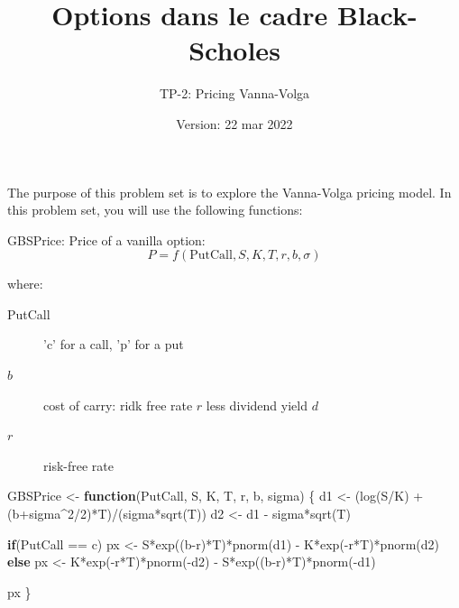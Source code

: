 \documentclass[
]{article}
\title{Options dans le cadre Black-Scholes}
\subtitle{TP-2: Pricing Vanna-Volga}
\author{}
\date{\vspace{-2.5em}Version: 22 mar 2022}
\newenvironment{Shaded}{\begin{snugshade}}{\end{snugshade}}
\newcommand{\ControlFlowTok}[1]{\textcolor[rgb]{0.13,0.29,0.53}{\textbf{#1}}}
\newcommand{\DecValTok}[1]{\textcolor[rgb]{0.00,0.00,0.81}{#1}}
\newcommand{\FunctionTok}[1]{\textcolor[rgb]{0.00,0.00,0.00}{#1}}
\newcommand{\NormalTok}[1]{#1}
\newcommand{\OtherTok}[1]{\textcolor[rgb]{0.56,0.35,0.01}{#1}}
\newcommand{\SpecialCharTok}[1]{\textcolor[rgb]{0.00,0.00,0.00}{#1}}
\newcommand{\StringTok}[1]{\textcolor[rgb]{0.31,0.60,0.02}{#1}}
\begin{document}
\maketitle

The purpose of this problem set is to explore the Vanna-Volga pricing
model. In this problem set, you will use the following functions:

GBSPrice: Price of a vanilla option: \[
P = f(\text{PutCall}, S, K, T, r, b, \sigma)
\]

where:

\begin{description}
\item[PutCall] 'c' for a call, 'p' for a put
\item[$b$] cost of carry: ridk free rate $r$ less dividend yield $d$
\item[$r$] risk-free rate
\end{description}

\begin{Shaded}
\begin{Highlighting}[]
\NormalTok{GBSPrice }\OtherTok{\textless{}{-}} \ControlFlowTok{function}\NormalTok{(PutCall, S, K, T, r, b, sigma) \{}
\NormalTok{  d1 }\OtherTok{\textless{}{-}}\NormalTok{ (}\FunctionTok{log}\NormalTok{(S}\SpecialCharTok{/}\NormalTok{K) }\SpecialCharTok{+}\NormalTok{ (b}\SpecialCharTok{+}\NormalTok{sigma}\SpecialCharTok{\^{}}\DecValTok{2}\SpecialCharTok{/}\DecValTok{2}\NormalTok{)}\SpecialCharTok{*}\NormalTok{T)}\SpecialCharTok{/}\NormalTok{(sigma}\SpecialCharTok{*}\FunctionTok{sqrt}\NormalTok{(T))}
\NormalTok{  d2 }\OtherTok{\textless{}{-}}\NormalTok{ d1 }\SpecialCharTok{{-}}\NormalTok{ sigma}\SpecialCharTok{*}\FunctionTok{sqrt}\NormalTok{(T)}

  \ControlFlowTok{if}\NormalTok{(PutCall }\SpecialCharTok{==} \StringTok{\textquotesingle{}c\textquotesingle{}}\NormalTok{)  }
\NormalTok{    px }\OtherTok{\textless{}{-}}\NormalTok{ S}\SpecialCharTok{*}\FunctionTok{exp}\NormalTok{((b}\SpecialCharTok{{-}}\NormalTok{r)}\SpecialCharTok{*}\NormalTok{T)}\SpecialCharTok{*}\FunctionTok{pnorm}\NormalTok{(d1) }\SpecialCharTok{{-}}\NormalTok{ K}\SpecialCharTok{*}\FunctionTok{exp}\NormalTok{(}\SpecialCharTok{{-}}\NormalTok{r}\SpecialCharTok{*}\NormalTok{T)}\SpecialCharTok{*}\FunctionTok{pnorm}\NormalTok{(d2)}
  \ControlFlowTok{else}
\NormalTok{    px }\OtherTok{\textless{}{-}}\NormalTok{ K}\SpecialCharTok{*}\FunctionTok{exp}\NormalTok{(}\SpecialCharTok{{-}}\NormalTok{r}\SpecialCharTok{*}\NormalTok{T)}\SpecialCharTok{*}\FunctionTok{pnorm}\NormalTok{(}\SpecialCharTok{{-}}\NormalTok{d2) }\SpecialCharTok{{-}}\NormalTok{ S}\SpecialCharTok{*}\FunctionTok{exp}\NormalTok{((b}\SpecialCharTok{{-}}\NormalTok{r)}\SpecialCharTok{*}\NormalTok{T)}\SpecialCharTok{*}\FunctionTok{pnorm}\NormalTok{(}\SpecialCharTok{{-}}\NormalTok{d1)}

\NormalTok{px}
\NormalTok{\}}
\end{Highlighting}
\end{Shaded}
\end{document}
